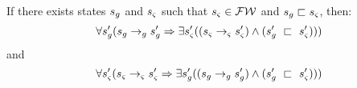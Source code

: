\begin{lemma}
\label{lem:write}
If there exists states $s_{g}$ and $s_{\varsigma}$ such that $s_{\varsigma} \in \mathcal{FW}$ and $s_{g} \sqsubset s_{\varsigma}$, then:
\begin{equation}
\forall s_{g}^\prime ( s_{g} \rightarrow_{g} s_{g}^\prime \Rightarrow \exists s_{\varsigma}^\prime( (s_{\varsigma} \rightarrow_{\varsigma} s_{\varsigma}^\prime )\wedge (s_{g}^\prime\ \sqsubset\ s_{\varsigma}^\prime ))  )
\end{equation}
and
\begin{equation}
\forall s_{\varsigma}^\prime ( s_{\varsigma} \rightarrow_{\varsigma} s_{\varsigma}^\prime\Rightarrow \exists s_{g}^\prime( (s_{g} \rightarrow_{g} s_{g}^\prime )\wedge (s_{g}^\prime\ \sqsubset\ s_{\varsigma}^\prime ))  )
\end{equation}
\end{lemma}

